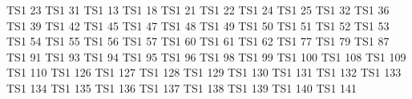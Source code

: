 \exchardef  \excapitalcompwordmark   TS1   23
\exchardef  \exascendercompwordmark  TS1   31
\exchardef  \exquotestraightbase     TS1   13
\exchardef  \exquotestraightdblbase  TS1   18
\exchardef  \extwelveudash           TS1   21
\exchardef  \exthreequartersemdash   TS1   22
\exchardef  \exleftarrow             TS1   24
\exchardef  \exrightarrow            TS1   25
\exchardef  \exblank                 TS1   32
\exchardef  \exdollar                TS1   36
\exchardef  \exquotesingle           TS1   39
\exchardef  \exasteriskcentered      TS1   42
\exchardef  \exdblhyphen             TS1   45
\exchardef  \exfractionsolidus       TS1   47
\exchardef  \exzerooldstyle          TS1   48
\exchardef  \exoneoldstyle           TS1   49
\exchardef  \extwooldstyle           TS1   50
\exchardef  \exthreeoldstyle         TS1   51
\exchardef  \exfouroldstyle          TS1   52
\exchardef  \exfiveoldstyle          TS1   53
\exchardef  \exsixoldstyle           TS1   54
\exchardef  \exsevenoldstyle         TS1   55
\exchardef  \exeightoldstyle         TS1   56
\exchardef  \exnineoldstyle          TS1   57
\exchardef  \exlangle                TS1   60
\exchardef  \exminus                 TS1   61
\exchardef  \exrangle                TS1   62
\exchardef  \exmho                   TS1   77
\exchardef  \exbigcircle             TS1   79
\exchardef  \exohm                   TS1   87
\exchardef  \exlbrackdbl             TS1   91
\exchardef  \exrbrackdbl             TS1   93
\exchardef  \exuparrow               TS1   94
\exchardef  \exdownarrow             TS1   95
\exchardef  \exasciigrave            TS1   96
\exchardef  \exborn                  TS1   98
\exchardef  \exdivorced              TS1   99
\exchardef  \exdied                  TS1  100
\exchardef  \exleaf                  TS1  108
\exchardef  \exmarried               TS1  109
\exchardef  \exmusicalnote           TS1  110
\exchardef  \extildelow              TS1  126
\exchardef  \exdblhyphenchar         TS1  127
\exchardef  \exasciibreve            TS1  128
\exchardef  \exasciicaron            TS1  129
\exchardef  \exacutedbl              TS1  130
\exchardef  \exgravedbl              TS1  131
\exchardef  \exdagger                TS1  132
\exchardef  \exdaggerdbl             TS1  133
\exchardef  \exbardbl                TS1  134
\exchardef  \experthousand           TS1  135
\exchardef  \exbullet                TS1  136
\exchardef  \excelsius               TS1  137
\exchardef  \exdollaroldstyle        TS1  138
\exchardef  \excentoldstyle          TS1  139
\exchardef  \exflorin                TS1  140
\exchardef  \excolonmonetary         TS1  141

